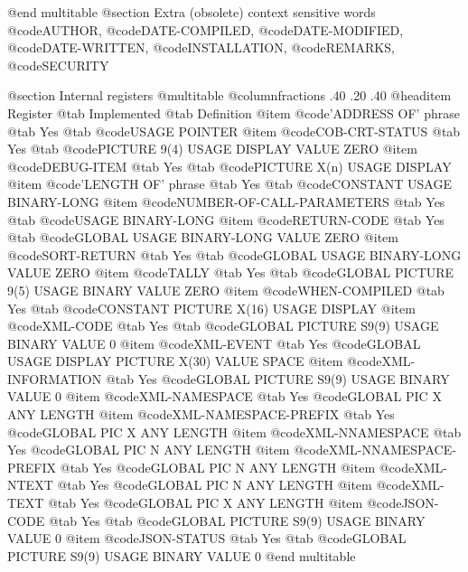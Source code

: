 @end multitable
@section Extra (obsolete) context sensitive words
@code{AUTHOR}, @code{DATE-COMPILED}, @code{DATE-MODIFIED}, @code{DATE-WRITTEN}, @code{INSTALLATION}, @code{REMARKS}, @code{SECURITY}

@section Internal registers
@multitable @columnfractions .40 .20 .40
@headitem Register @tab Implemented @tab Definition
@item @code{'ADDRESS OF' phrase} @tab Yes @tab @code{USAGE POINTER}
@item @code{COB-CRT-STATUS} @tab Yes @tab @code{PICTURE 9(4) USAGE DISPLAY VALUE ZERO}
@item @code{DEBUG-ITEM} @tab Yes @tab @code{PICTURE X(n) USAGE DISPLAY}
@item @code{'LENGTH OF' phrase} @tab Yes @tab @code{CONSTANT USAGE BINARY-LONG}
@item @code{NUMBER-OF-CALL-PARAMETERS} @tab Yes @tab @code{USAGE BINARY-LONG}
@item @code{RETURN-CODE} @tab Yes @tab @code{GLOBAL USAGE BINARY-LONG VALUE ZERO}
@item @code{SORT-RETURN} @tab Yes @tab @code{GLOBAL USAGE BINARY-LONG VALUE ZERO}
@item @code{TALLY} @tab Yes @tab @code{GLOBAL PICTURE 9(5) USAGE BINARY VALUE ZERO}
@item @code{WHEN-COMPILED} @tab Yes @tab @code{CONSTANT PICTURE X(16) USAGE DISPLAY}
@item @code{XML-CODE} @tab Yes @tab @code{GLOBAL PICTURE S9(9) USAGE BINARY VALUE 0}
@item @code{XML-EVENT} @tab Yes @code{GLOBAL USAGE DISPLAY PICTURE X(30) VALUE SPACE}
@item @code{XML-INFORMATION} @tab Yes @code{GLOBAL PICTURE S9(9) USAGE BINARY VALUE 0}
@item @code{XML-NAMESPACE} @tab Yes @code{GLOBAL PIC X ANY LENGTH}
@item @code{XML-NAMESPACE-PREFIX} @tab Yes @code{GLOBAL PIC X ANY LENGTH}
@item @code{XML-NNAMESPACE} @tab Yes @code{GLOBAL PIC N ANY LENGTH}
@item @code{XML-NNAMESPACE-PREFIX} @tab Yes @code{GLOBAL PIC N ANY LENGTH}
@item @code{XML-NTEXT} @tab Yes @code{GLOBAL PIC N ANY LENGTH}
@item @code{XML-TEXT} @tab Yes @code{GLOBAL PIC X ANY LENGTH}
@item @code{JSON-CODE} @tab Yes @tab @code{GLOBAL PICTURE S9(9) USAGE BINARY VALUE 0}
@item @code{JSON-STATUS} @tab Yes @tab @code{GLOBAL PICTURE S9(9) USAGE BINARY VALUE 0}
@end multitable

